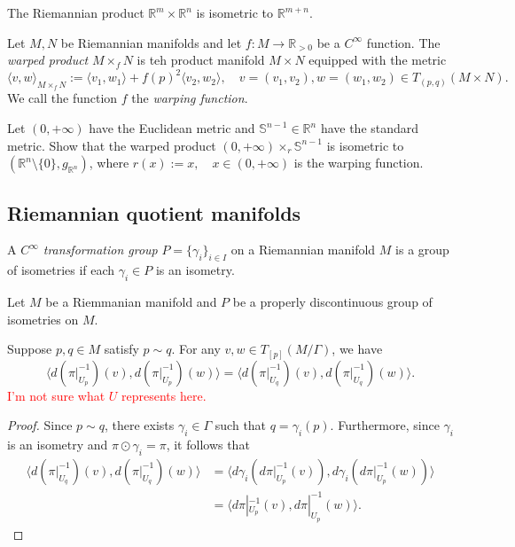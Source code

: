 \begin{example}
The Riemannian product $\mathbb{R}^m \times \mathbb{R}^n$ is isometric to $\mathbb{R}^{m+n}$.
\end{example}

\begin{definition}
Let $M, N$ be Riemannian manifolds and let $f : M \to \mathbb{R}_{>0}$ be a $C^{\infty}$ function. 
The \emph{warped product} $M \times_f N$ is teh product manifold $M\times N$ equipped with the metric
\[
\langle v, w \rangle_{M \times_f N} := \langle v_1, w_1\rangle + f(p)^2 \langle v_2, w_2 \rangle, \quad v = (v_1, v_2), w = (w_1, w_2) \in T_{(p,q)}(M \times N).
\]
We call the function $f$ the \emph{warping function}.
\end{definition}

\begin{problem}
Let $(0, +\infty)$ have the Euclidean metric and $\mathbb{S}^{n-1} \in \mathbb{R}^n$ have the standard metric.
Show that the warped product $(0, +\infty) \times_r \mathbb{S}^{n-1}$ is isometric to $(\mathbb{R}^n \setminus \{0\},g_{\mathbb{R}^n})$,
where $r(x) := x,\quad x \in (0, +\infty)$ is the warping function. 
\end{problem}

\subsection{Riemannian quotient manifolds}

\begin{definition}
A \emph{$C^{\infty}$ transformation group} $P = \{\gamma_i\}_{i\in I}$ on a Riemannian manifold $M$ is a group of isometries if each $\gamma_i \in P$ is an isometry.
\end{definition}
Let $M$ be a Riemmanian manifold and $P$ be a properly discontinuous group of isometries on $M$.
\begin{lemma}
Suppose $p,q \in M$ satisfy $p \sim q$. For any $v, w \in T_{[p]}(M/\Gamma)$, we have 
\[
\langle d(\pi|_{U_p}^{-1})(v), d(\pi|_{U_p}^{-1})(w) \rangle = \langle d(\pi|_{U_q}^{-1})(v), d(\pi|_{U_q}^{-1})(w) \rangle.
\]
\textcolor{red}{I'm not sure what $U$ represents here.}
\end{lemma}

\begin{proof}
Since $p\sim q$, there exists $\gamma_i \in \Gamma$ such that $q = \gamma_i(p)$.
Furthermore, since $\gamma_i$ is an isometry and $\pi \odot \gamma_i = \pi$, it follows that
\[
\begin{aligned}
\langle d (\pi|_{U_q}^{-1})(v), d(\pi|_{U_q}^{-1})(w)\rangle
&= \langle d\gamma_i(d\pi|_{U_p}^{-1}(v)), d\gamma_i(d\pi|_{U_p}^{-1}(w)) \rangle \\
&= \langle d\pi|_{U_p}^{-1}(v), d\pi|_{U_p}^{-1}(w) \rangle.
\end{aligned}
\]
\end{proof}

